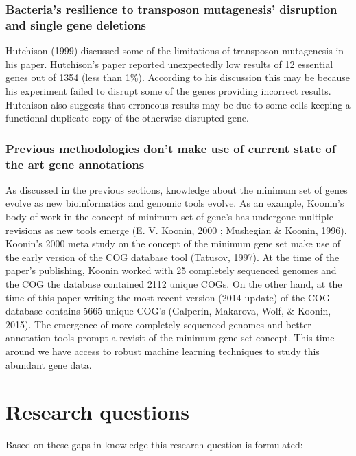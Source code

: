 \documentclass[]{report}
\begin{document}
\subsection{Bacteria's resilience to transposon mutagenesis' disruption
and single gene
deletions}\label{bacterias-resilience-to-transposon-mutagenesis-disruption-and-single-gene-deletions}

Hutchison (1999) discussed some of the limitations of transposon
mutagenesis in his paper. Hutchison's paper reported unexpectedly low
results of 12 essential genes out of 1354 (less than 1\%). According to
his discussion this may be because his experiment failed to disrupt some
of the genes providing incorrect results. Hutchison also suggests that
erroneous results may be due to some cells keeping a functional
duplicate copy of the otherwise disrupted gene.

\subsection{Previous methodologies don't make use of current state of
the art gene
annotations}\label{previous-methodologies-dont-make-use-of-current-state-of-the-art-gene-annotations}

As discussed in the previous sections, knowledge about the minimum set
of genes evolve as new bioinformatics and genomic tools evolve. As an
example, Koonin's body of work in the concept of minimum set of gene's
has undergone multiple revisions as new tools emerge (E. V. Koonin, 2000
; Mushegian \& Koonin, 1996). Koonin's 2000 meta study on the concept of
the minimum gene set make use of the early version of the COG database
tool (Tatusov, 1997). At the time of the paper's publishing, Koonin
worked with 25 completely sequenced genomes and the COG the database
contained 2112 unique COGs. On the other hand, at the time of this paper
writing the most recent version (2014 update) of the COG database
contains 5665 unique COG's (Galperin, Makarova, Wolf, \& Koonin, 2015).
The emergence of more completely sequenced genomes and better annotation
tools prompt a revisit of the minimum gene set concept. This time around
we have access to robust machine learning techniques to study this
abundant gene data.

\chapter{Research questions}\label{research-questions}

Based on these gaps in knowledge this research question is formulated:
\end{document}
